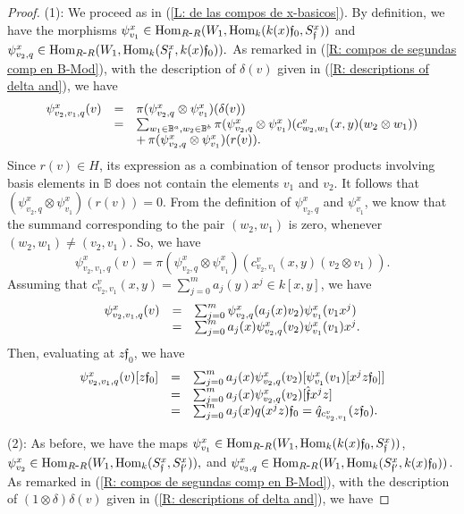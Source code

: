 \documentclass{article}
\theoremstyle{definition}
\newcommand{\Hom}{{ \rm Hom }}
\renewcommand{\frak}{\mathfrak}
\newcommand{\g}{\hbox{-}}
\newcommand{\hueca}[1]{\mathbb{#1}}
\begin{document}
\begin{proof} (1): We proceed as in (\ref{L: de las compos de x-basicos}). 
 By definition, we have the morphisms 
$\psi^x_{v_1}\in \Hom_{R\g R}(W_1,\Hom_k(k(x)\frak{f}_0,S^x_\frak{f}))$  and  $\psi^x_{v_2,q}\in \Hom_{R\g R}(W_1,\Hom_k(S^x_\frak{f},k(x)\frak{f}_0)).$
As remarked in (\ref{R: compos de segundas comp en B-Mod}), with the description of $\delta(v)$ given  in (\ref{R: descriptions of delta and}), we have 
$$\begin{matrix} 
\psi^x_{v_2,v_1,q}(v)&=&\pi (\psi^x_{v_2,q}\otimes\psi^x_{v_1})(\delta(v))\hfill\\
&=&
\sum_{w_1\in \hueca{B}^a,w_2\in \hueca{B}^b}\pi (\psi^x_{v_2,q}\otimes\psi^x_{v_1})(c^v_{w_2,w_1}(x,y)(w_2\otimes w_1))\hfill\\
&&+\,\pi (\psi^x_{v_2,q}\otimes\psi^x_{v_1})(r(v)).\hfill\\
\end{matrix}$$
Since $r(v)\in H$, its expression as a combination of tensor products involving  basis  elements in $\hueca{B}$ does not contain the elements $v_1$ and $v_2$. It follows that  $(\psi^x_{v_2,q}\otimes\psi^x_{v_1})(r(v))=0$. From the definition of $\psi^x_{v_2,q}$ and $\psi^x_{v_1}$, we know that the summand corresponding to the pair $(w_2, w_1)$ is zero, whenever $(w_2,w_1)\not=(v_2,v_1)$. So, we have 
$$\psi^x_{v_2,v_1,q}(v)=\pi (\psi^x_{v_2,q}\otimes\psi^x_{v_1})(c^v_{v_2,v_1}(x,y)(v_2\otimes v_1)). 
$$
Assuming that $c^v_{v_2,v_1}(x,y)=\sum_{j=0}^ma_j(y)x^j\in k[x,y]$, we have 
$$\begin{matrix}\psi^x_{v_2,v_1,q}(v)

&=&
\sum_{j=0}^m\psi^x_{v_2,q}(a_j(x)v_2)\psi^x_{v_1}(v_1x^j)\hfill\\
&=&
\sum_{j=0}^ma_j(x)\psi^x_{v_2,q}(v_2)\psi^x_{v_1}(v_1)x^j.\hfill\\
\end{matrix}$$
Then, evaluating at $z\frak{f}_0$, we have
$$\begin{matrix}
\psi^x_{v_2,v_1,q}(v)[z\frak{f}_0]
&=&
\sum_{j=0}^ma_j(x)\psi^x_{v_2,q}(v_2)[\psi^x_{v_1}(v_1)[x^jz\frak{f}_0]]\hfill\\
&=&
\sum_{j=0}^ma_j(x)\psi^x_{v_2,q}(v_2)[\hat{\frak{f}}x^jz]\hfill\\
&=&
\sum_{j=0}^ma_j(x)q(x^jz)\frak{f}_0
=\hat{q}_{c^v_{v_2,v_1}}(z\frak{f}_0).\hfill\\
\end{matrix}$$
\medskip

\noindent(2): As before, we have the maps  
$\psi^x_{v_1}\in \Hom_{R\g R}(W_1,\Hom_k(k(x)\frak{f}_0,S^x_\frak{f}))$,  
$\psi^x_{v_2}\in \Hom_{R\g R}(W_1,\Hom_k(S^x_\frak{f},S^x_{\frak{f}'})),$
and $\psi^x_{v_3,q}\in \Hom_{R\g R}(W_1,\Hom_k(S^x_{\frak{f}'},k(x)\frak{f}_0))$. 
As remarked in (\ref{R: compos de segundas comp en B-Mod}), with the description of $(1\otimes\delta)\delta(v)$ given  in (\ref{R: descriptions of delta and}), we have 


\end{proof}
\end{document}
